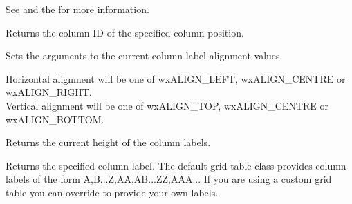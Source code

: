 See 
and the  for more information.



\label{wxgridgetcolat}


Returns the column ID of the specified column position.


\label{wxgridgetcolleft}




\label{wxgridgetcollabelalignment}


Sets the arguments to the current column label alignment values.

Horizontal alignment will be one of wxALIGN\_LEFT, wxALIGN\_CENTRE or wxALIGN\_RIGHT.\\
Vertical alignment will be one of wxALIGN\_TOP, wxALIGN\_CENTRE or wxALIGN\_BOTTOM.




\label{wxgridgetcollabelsize}


Returns the current height of the column labels.



\label{wxgridgetcollabelvalue}


Returns the specified column label. The default grid table class provides column labels of
the form A,B...Z,AA,AB...ZZ,AAA... If you are using a custom grid table you can override
 to provide
your own labels.



\label{wxgridgetcolminimalacceptablewidth}


